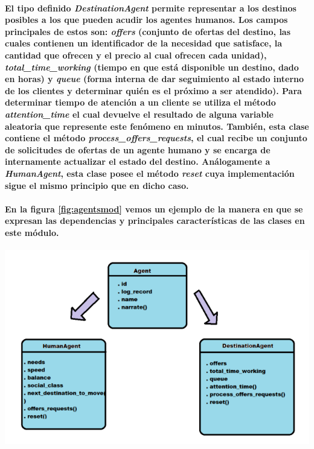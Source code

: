 \documentclass[12pt]{amsart}
\begin{document}
\paragraph{El tipo definido \textit{DestinationAgent} permite representar a los destinos posibles a los que pueden acudir los agentes humanos. Los campos principales de estos son: \textit{offers} (conjunto de ofertas del destino, las cuales contienen un identificador de la necesidad que satisface, la cantidad que ofrecen y el precio al cual ofrecen cada unidad), \textit{total\_time\_working} (tiempo en que está disponible un destino, dado en horas) y \textit{queue} (forma interna de dar seguimiento al estado interno de los clientes y determinar quién es el próximo a ser atendido). Para determinar tiempo de atención a un cliente se utiliza el método \textit{attention\_time} el cual devuelve el resultado de alguna variable aleatoria que represente este fenómeno en minutos. También, esta clase contiene el método \textit{process\_offers\_requests}, el cual recibe un conjunto de solicitudes de ofertas de un agente humano y se encarga de internamente actualizar el estado del destino. Análogamente a \textit{HumanAgent}, esta clase posee el método \textit{reset} cuya implementación sigue el mismo principio que en dicho caso.}

\paragraph{En la figura \ref{fig:agentsmod} vemos un ejemplo de la manera en que se expresan las dependencias y principales características de las clases en este módulo.}

\begin{center}
	\includegraphics[scale=0.8]{./images/agentsmod.png}
	\label{fig:agentsmod}
\end{center}
\end{document}
